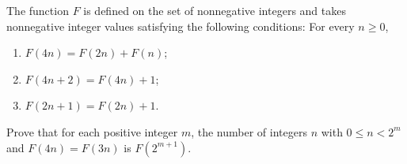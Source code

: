 The function $F$ is defined on the set of nonnegative integers and takes nonnegative integer values satisfying the following conditions: For every $n \geq 0$,
\begin{enumerate}
\item[(i)] $F(4n) = F(2n) + F(n)$;
\item[(ii)] $F(4n + 2) = F(4n) + 1$;
\item[(iii)] $F(2n + 1) = F(2n) + 1$.
\end{enumerate}
Prove that for each positive integer $m$, the number of integers $n$ with $0 \leq n < 2^m$ and $F(4n) = F(3n)$ is $F(2^{m+1})$.

